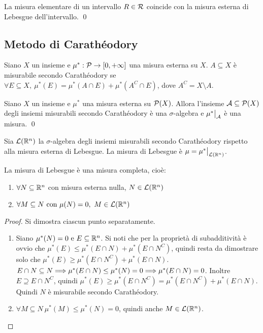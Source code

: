 \begin{prop}
	La misura elementare di un intervallo $R \in \mathcal{R}$ coincide con la misura esterna di Lebesgue dell'intervallo.
	\qed
\end{prop}

\subsection{Metodo di Carathéodory}

\begin{definition}
	Siano $X$ un insieme e $\mu^*:\mathcal{P} \to [0,+\infty]$ una misura esterna su $X$. $A\subseteq X$ è misurabile secondo Carathéodory se $\forall E \subseteq X, \ \mu^*(E)=\mu^*(A\cap E) + \mu^*\left(A^C \cap E\right)$, dove $A^C=X\setminus A$.
\end{definition}

\begin{theorem}
	Siano $X$ un insieme e $\mu^*$ una misura esterna su $\mathcal{P}(X)$. Allora l'insieme $\mathcal{A} \subseteq \mathcal{P}(X)$ degli insiemi misurabili secondo Carathéodory è una $\sigma$-algebra e $\restr{\mu^*}{\A}$ è una misura.
	\qed
\end{theorem}

\begin{definition}
	Sia $\mathcal{L}(\mathbb{R}^n)$ la $\sigma$-algebra degli insiemi misurabili secondo Carathéodory rispetto alla misura esterna di Lebesgue. La misura di Lebesgue è $\mu=\restr{\mu^*}{\mathcal{L}(\R^n)}$.
\end{definition}

\begin{theorem}
	La misura di Lebesgue è una misura completa, cioè:
	\begin{enumerate}
		\item $\forall N \subseteq \mathbb{R}^n$ con misura esterna nulla, $N \in \mathcal{L}(\mathbb{R}^n)$
		\item $\forall M \subseteq N \text{ con } \mu(N)=0, \ M \in \mathcal{L}(\mathbb{R}^n)$
	\end{enumerate}
\end{theorem}

\begin{proof}
	Si dimostra ciascun punto separatamente.
	\begin{enumerate}
		\item Siano $\mu^*(N)=0 \text{ e } E \subseteq \mathbb{R}^n$. Si noti che per la proprietà di subadditività è ovvio che $\mu^*(E)\leq \mu^*(E\cap N)+\mu^*\left(E\cap N^C\right)$, quindi resta da dimostrare solo che $\mu^*(E)\geq\mu^*\left(E\cap N^C\right)+\mu^*(E\cap N)$. $E \cap N \subseteq N\Longrightarrow \mu^*(E\cap N)\leq\mu^*(N)=0\Longrightarrow \mu^*(E\cap N)=0$. Inoltre $E\supseteq E\cap N^C$, quindi $\mu^*(E)\geq \mu^*\left(E\cap N^C\right)=\mu^*\left(E\cap N^C\right)+\mu^*(E\cap N)$. Quindi $N$ è misurabile secondo Carathéodory.
		\item $\forall M\subseteq N \ \mu^*(M)\leq\mu^*(N)=0$, quindi anche $M\in \mathcal{L}(\mathbb{R}^n)$.
	\end{enumerate}
\end{proof}

